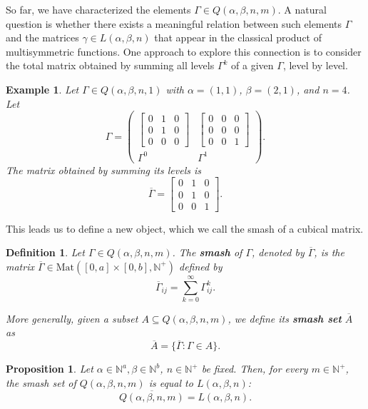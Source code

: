 \documentclass[11pt]{article}
\newtheorem{prop}[thm]{Proposition} %
\newtheorem{defi}[thm]{Definition}
\newtheorem{exa}[thm]{Example}
\begin{document}
So far, we have characterized the elements $\Gamma \in Q(\alpha,\beta,n,m) $. A natural question is whether there exists a meaningful relation between such elements $ \Gamma $ and the matrices $ \gamma \in L(\alpha,\beta,n) $ that appear in the classical product of multisymmetric functions. One approach to explore this connection is to consider the total matrix obtained by summing all levels $ \Gamma^k $ of a given $ \Gamma $, level by level.



\begin{exa}
	Let \( \Gamma \in Q(\alpha,\beta,n,1) \) with \( \alpha=(1,1) \), \( \beta=(2,1) \), and \( n=4 \). Let
	$$
	\Gamma =
	\left(
	\begin{array}{cc}
	\begin{bmatrix}
		0 & 1 & 0\\
		0 & 1 & 0\\
		0 & 0 & 0
	\end{bmatrix} &
	\begin{bmatrix}
		0 & 0 & 0\\
		0 & 0 & 0\\
		0 & 0 & 1
	\end{bmatrix} \\
	\Gamma^0 & \Gamma^1
	\end{array}
	\right).
	$$
	The matrix obtained by summing its levels is
	$$
	\overline{\Gamma} =
	\begin{bmatrix}
		0 & 1 & 0\\
		0 & 1 & 0\\
		0 & 0 & 1
	\end{bmatrix}.
	$$
\end{exa}
This leads us to define a new object, which we call the smash of a cubical matrix.
\begin{defi}\label{smash}
    Let $\Gamma \in Q(\alpha, \beta, n, m)$. The \textbf{smash} of $\Gamma$, denoted by $\overline{\Gamma}$, is the matrix $\overline{\Gamma} \in \mathrm{Mat}([0,a] \times [0,b], \mathbb{N}^{+})$ defined by
    \[
        \overline{\Gamma}_{ij} = \sum_{k=0}^{\infty} \Gamma_{ij}^k.
    \]

    More generally, given a subset $A \subseteq Q(\alpha,\beta,n,m)$, we define its \textbf{smash set} $\overline{A}$ as
    \[
        \overline{A} = \{ \overline{\Gamma} : \Gamma \in A \}.
    \]
\end{defi}




\begin{prop}\label{DeQaL}
    Let $\alpha  \in \mathbb{N}^a, \beta \in \mathbb{N}^b$, $n \in \mathbb{N}^{+}$ be fixed. Then, for every $m \in  \mathbb{N}^{+}$, the smash set of $Q(\alpha,\beta,n,m)$ is equal to $L(\alpha,\beta,n)$:
    $$
    \overline{Q(\alpha,\beta,n,m)} = L(\alpha,\beta,n).
    $$
\end{prop}
\end{document}
